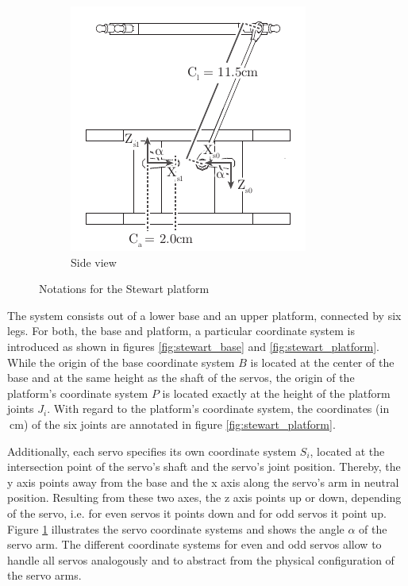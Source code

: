 \begin{figure}
	\begin{subfigure}{0.49\textwidth}
		\centering
		\includegraphics{../figures/stewart_side}
		\caption{Side view}
		\label{fig:stewart_side}
	\end{subfigure}
	\caption{Notations for the Stewart platform}
	\label{fig:stewart_notation}
\end{figure}

The system consists out of a lower base and an upper platform, connected by
six legs. For both, the base and platform, a particular coordinate system is
introduced as shown in figures \ref{fig:stewart_base} and
\ref{fig:stewart_platform}. While the origin of the base coordinate system $B$
is located at the center of the base and at the same height as the shaft of
the servos, the origin of the platform's coordinate system $P$ is located
exactly at the height of the platform joints $J_i$. With regard to the
platform's coordinate system, the coordinates (in $\SI{}{\centi\meter}$) of
the six joints are annotated in figure \ref{fig:stewart_platform}.

Additionally, each servo specifies its own coordinate system $S_i$, located at
the intersection point of the servo's shaft and the servo's joint position.
Thereby, the y axis points away from the base and the x axis along the servo's
arm in neutral position. Resulting from these two axes, the z axis points up
or down, depending of the servo, i.e. for even servos it points down and for
odd servos it point up. Figure \ref{fig:stewart_side} illustrates the servo
coordinate systems and shows the angle $\alpha$ of the servo arm. The
different coordinate systems for even and odd servos allow to handle all
servos analogously and to abstract from the physical configuration of the
servo arms.

